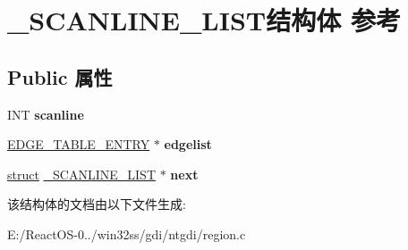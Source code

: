 \hypertarget{struct___s_c_a_n_l_i_n_e___l_i_s_t}{}\section{\+\_\+\+S\+C\+A\+N\+L\+I\+N\+E\+\_\+\+L\+I\+S\+T结构体 参考}
\label{struct___s_c_a_n_l_i_n_e___l_i_s_t}
\subsection*{Public 属性}
\begin{DoxyCompactItemize}
\item 
\mbox{\label{struct___s_c_a_n_l_i_n_e___l_i_s_t_ad08dec2bb0b72f633baadb639603f7be}} 
I\+NT {\bfseries scanline}
\item 
\mbox{\label{struct___s_c_a_n_l_i_n_e___l_i_s_t_a725e01710ba30ce7a16e596d6c7ae5e9}} 
\hyperlink{struct___e_d_g_e___t_a_b_l_e___e_n_t_r_y}{E\+D\+G\+E\+\_\+\+T\+A\+B\+L\+E\+\_\+\+E\+N\+T\+RY} $\ast$ {\bfseries edgelist}
\item 
\mbox{\label{struct___s_c_a_n_l_i_n_e___l_i_s_t_a2d000a7d289005ecf326e0a66986637e}} 
\hyperlink{interfacestruct}{struct} \hyperlink{struct___s_c_a_n_l_i_n_e___l_i_s_t}{\+\_\+\+S\+C\+A\+N\+L\+I\+N\+E\+\_\+\+L\+I\+ST} $\ast$ {\bfseries next}
\end{DoxyCompactItemize}


该结构体的文档由以下文件生成\+:\begin{DoxyCompactItemize}
\item 
E\+:/\+React\+O\+S-\/0../win32ss/gdi/ntgdi/region.\+c\end{DoxyCompactItemize}
